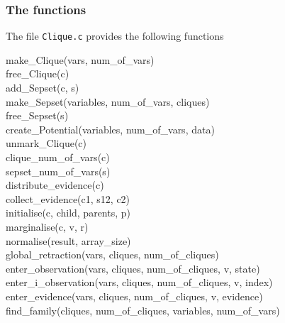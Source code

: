 \documentclass[12pt,a4paper]{report}
\begin{document}
\subsubsection{The functions}
The file \verb+Clique.c+ provides the following functions
\begin{description}
\item[make\_Clique(vars, num\_of\_vars)]

\item[free\_Clique(c)]

\item[add\_Sepset(c, s)]

\item[make\_Sepset(variables, num\_of\_vars, cliques)]

\item[free\_Sepset(s)]

\item[create\_Potential(variables, num\_of\_vars, data)]

\item[unmark\_Clique(c)]

\item[clique\_num\_of\_vars(c)]

\item[sepset\_num\_of\_vars(s)]

\item[distribute\_evidence(c)]

\item[collect\_evidence(c1, s12, c2)]

\item[initialise(c, child, parents, p)]

\item[marginalise(c, v, r)]

\item[normalise(result, array\_size)]

\item[global\_retraction(vars, cliques, num\_of\_cliques)]

\item[enter\_observation(vars, cliques, num\_of\_cliques, v, state)]

\item[enter\_i\_observation(vars, cliques, num\_of\_cliques, v, index)]

\item[enter\_evidence(vars, cliques, num\_of\_cliques, v, evidence)]

\item[find\_family(cliques, num\_of\_cliques, variables, num\_of\_vars)]


\end{description}
\end{document}
